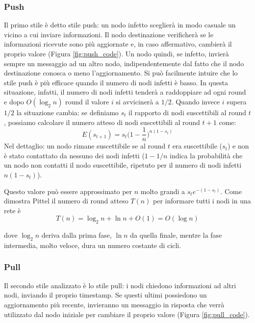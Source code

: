 \subsubsection{Push}
Il primo stile è detto stile push: un nodo infetto sceglierà in modo casuale un vicino a cui inviare informazioni. Il nodo destinazione verificherà se le informazioni ricevute sono più aggiornate e, in caso affermativo, cambierà il proprio valore (Figura \ref{fig:push_code}). Un nodo quindi, se infetto, invierà sempre un messaggio ad un altro nodo, indipendentemente dal fatto che il nodo destinazione conosca o meno l'aggiornamento. Si può facilmente intuire che lo stile push è più efficace quando il numero di nodi infetti è basso. In questa situazione, infatti, il numero di nodi infetti tenderà a raddoppiare ad ogni round e dopo $O(\log_2 n)$ round il valore $i$ si avvicinerà a $1/2$. Quando invece $i$ supera $1/2$ la situazione cambia: se definiamo $s_t$ il rapporto di nodi suscettibili al round $t$, possiamo calcolare il numero atteso di nodi suscettibili al round $t + 1$ come:
\begin{equation}
    E(s_{t + 1}) = s_t  \Big(1 - \frac{1}{n}\Big)^{n(1-s_t)}
\end{equation}
Nel dettaglio: un nodo rimane suscettibile se al round $t$ era suscettibile ($s_t$) e non è stato contattato da nessuno dei nodi infetti ($1-1/n$ indica la probabilità che un nodo non contatti il nodo suscettibile, ripetuto per il numero di nodi infetti $n(1-s_t)$).

Questo valore può essere approssimato per $n$ molto grandi a $s_t e^{-(1-s_t)}$. Come dimostra Pittel \cite{pittel} il numero di round atteso $T(n)$ per informare tutti i nodi in una rete è
\begin{equation}
    T(n)= \log_2 n + \ln n + O(1) = O(\log n)
\end{equation}

dove $\log_2 n$ deriva dalla prima fase, $\ln n$ da quella finale, mentre la fase intermedia, molto veloce, dura un numero costante di cicli.
\subsubsection{Pull}
Il secondo stile analizzato è lo stile pull: i nodi chiedono informazioni ad altri nodi, inviando il proprio timestamp. Se questi ultimi possiedono un aggiornamento più recente, invieranno un messaggio in risposta che verrà utilizzato dal nodo iniziale per cambiare il proprio valore (Figura \ref{fig:pull_code}).

